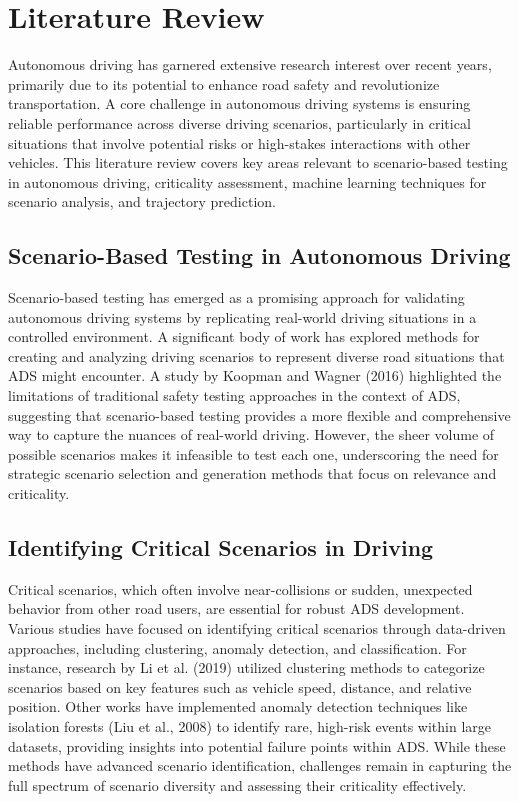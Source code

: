 \documentclass[12pt,a4paper]{report}
\begin{document}
\section{Literature Review}

Autonomous driving has garnered extensive research interest over recent years, primarily due to its potential to enhance road safety and revolutionize transportation. A core challenge in autonomous driving systems is ensuring reliable performance across diverse driving scenarios, particularly in critical situations that involve potential risks or high-stakes interactions with other vehicles. This literature review covers key areas relevant to scenario-based testing in autonomous driving, criticality assessment, machine learning techniques for scenario analysis, and trajectory prediction.

\subsection*{Scenario-Based Testing in Autonomous Driving}

Scenario-based testing has emerged as a promising approach for validating autonomous driving systems by replicating real-world driving situations in a controlled environment. A significant body of work has explored methods for creating and analyzing driving scenarios to represent diverse road situations that ADS might encounter. A study by Koopman and Wagner (2016) highlighted the limitations of traditional safety testing approaches in the context of ADS, suggesting that scenario-based testing provides a more flexible and comprehensive way to capture the nuances of real-world driving. However, the sheer volume of possible scenarios makes it infeasible to test each one, underscoring the need for strategic scenario selection and generation methods that focus on relevance and criticality.


\subsection*{Identifying Critical Scenarios in Driving}

Critical scenarios, which often involve near-collisions or sudden, unexpected behavior from other road users, are essential for robust ADS development. Various studies have focused on identifying critical scenarios through data-driven approaches, including clustering, anomaly detection, and classification. For instance, research by Li et al. (2019) utilized clustering methods to categorize scenarios based on key features such as vehicle speed, distance, and relative position. Other works have implemented anomaly detection techniques like isolation forests (Liu et al., 2008) to identify rare, high-risk events within large datasets, providing insights into potential failure points within ADS. While these methods have advanced scenario identification, challenges remain in capturing the full spectrum of scenario diversity and assessing their criticality effectively.
\end{document}
